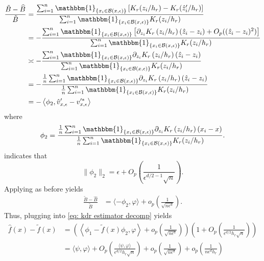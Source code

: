 \documentclass[11pt]{article}
\begin{document}
\begin{align}
    \frac{\tilde{B} - \widehat{B}}{\tilde{B}} &= \frac{\sum_{i = 1}^n\mathbbm{1}_{\{x_i \in \mathcal{B}(x, \epsilon)\}}\left[K_r(z_i/h_r) - K_r(\hat{z}_i'/h_r)\right]
    }{\sum_{i = 1}^n\mathbbm{1}_{\{x_i \in \mathcal{B}(x, \epsilon)\}}K_r(z_i/h_r)} \\
    &= -\frac{\sum_{i = 1}^n\mathbbm{1}_{\{x_i \in \mathcal{B}(x, \epsilon)\}}\left[\partial_{z_i}K_r\left(z_i/h_r\right)(\hat{z}_i - z_i) + O_p((\hat{z}_i - z_i)^2)\right]
    }{\sum_{i = 1}^n\mathbbm{1}_{\{x_i \in \mathcal{B}(x, \epsilon)\}}K_r(z_i/h_r)} \\
    &\asymp -\frac{\sum_{i = 1}^n\mathbbm{1}_{\{x_i \in \mathcal{B}(x, \epsilon)\}}\partial_{z_i}K_r\left(z_i/h_r\right)(\hat{z}_i - z_i)
    }{\sum_{i = 1}^n\mathbbm{1}_{\{x_i \in \mathcal{B}(x, \epsilon)\}}K_r(z_i/h_r)} \\
    &= -\frac{\frac{1}{n}\sum_{i = 1}^n\mathbbm{1}_{\{x_i \in \mathcal{B}(x, \epsilon)\}}\partial_{z_i}K_r\left(z_i/h_r\right)(\hat{z}_i - z_i)
    }{\frac{1}{n}\sum_{i = 1}^n\mathbbm{1}_{\{x_i \in \mathcal{B}(x, \epsilon)\}}K_r(z_i/h_r)} \\
    &= -\left\langle \phi_2, \hat{v}'_{x, \epsilon} -v'^*_{x, \epsilon}\right\rangle
\end{align}
where 
\begin{equation}
    \phi_2 = \frac{\frac{1}{n}\sum_{i = 1}^n\mathbbm{1}_{\{x_i \in \mathcal{B}(x, \epsilon)\}}\partial_{z_i}K_r\left(z_i/h_r\right)(x_i - x)
    }{\frac{1}{n}\sum_{i = 1}^n\mathbbm{1}_{\{x_i \in \mathcal{B}(x, \epsilon)\}}K_r(z_i/h_r)}.
\end{equation}
 indicates that 
\begin{equation}
    \|\phi_2\|_2 = \epsilon + O_p\left(\frac{1}{\epsilon^{d/2-1}\sqrt{n}}\right).
\end{equation}
Applying  as before yields 
\begin{align}
    \frac{\tilde{B} - \widehat{B}}{\tilde{B}} &= \langle-\phi_{2}, \varphi\rangle + o_p\left(\frac{1}{\sqrt{n\epsilon^{d}}}\right).
\end{align}
Thus, plugging into \cref{eq: kdr estimator decomp} yields
\begin{align}
    \hat{f}(x) - \tilde{f}(x) &= \left(\left\langle\phi_{1}-\tilde{f}(x)\phi_{2}, \varphi\right\rangle +  o_p\left(\frac{1}{\sqrt{n\epsilon^{d}}}\right)\right)\left(1  + O_p\left(\frac{1}{\epsilon^{d/2}h_r\sqrt{n}}\right)\right) \\
    &= \langle\psi, \varphi\rangle + O_p\left(\frac{\langle \psi, \varphi\rangle}{\epsilon^{d/2}h_r\sqrt{n}}\right) + o_p\left(\frac{1}{\sqrt{n\epsilon^{d}}} \right) + o_p\left(\frac{1}{n\epsilon^{d}h_r}\right)
\end{align}
\end{document}
